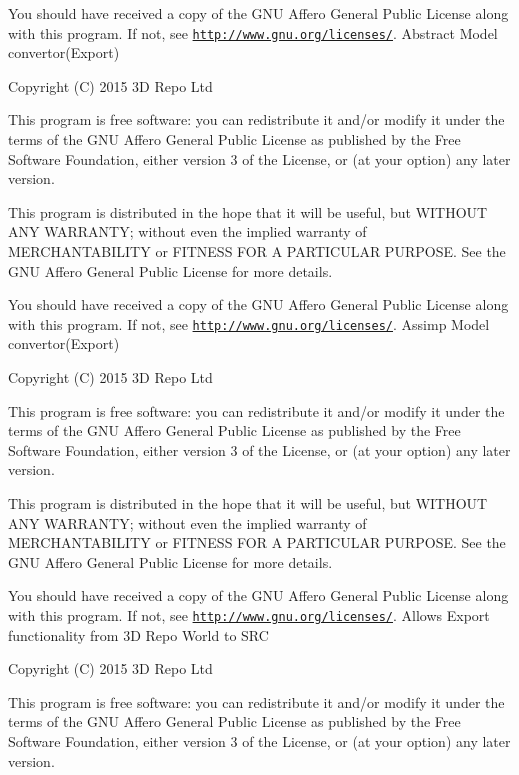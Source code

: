 You should have received a copy of the G\+N\+U Affero General Public License along with this program. If not, see \href{http://www.gnu.org/licenses/}{\tt http\+://www.\+gnu.\+org/licenses/}. Abstract Model convertor(\+Export)

Copyright (C) 2015 3\+D Repo Ltd

This program is free software\+: you can redistribute it and/or modify it under the terms of the G\+N\+U Affero General Public License as published by the Free Software Foundation, either version 3 of the License, or (at your option) any later version.

This program is distributed in the hope that it will be useful, but W\+I\+T\+H\+O\+U\+T A\+N\+Y W\+A\+R\+R\+A\+N\+T\+Y; without even the implied warranty of M\+E\+R\+C\+H\+A\+N\+T\+A\+B\+I\+L\+I\+T\+Y or F\+I\+T\+N\+E\+S\+S F\+O\+R A P\+A\+R\+T\+I\+C\+U\+L\+A\+R P\+U\+R\+P\+O\+S\+E. See the G\+N\+U Affero General Public License for more details.

You should have received a copy of the G\+N\+U Affero General Public License along with this program. If not, see \href{http://www.gnu.org/licenses/}{\tt http\+://www.\+gnu.\+org/licenses/}. Assimp Model convertor(\+Export)

Copyright (C) 2015 3\+D Repo Ltd

This program is free software\+: you can redistribute it and/or modify it under the terms of the G\+N\+U Affero General Public License as published by the Free Software Foundation, either version 3 of the License, or (at your option) any later version.

This program is distributed in the hope that it will be useful, but W\+I\+T\+H\+O\+U\+T A\+N\+Y W\+A\+R\+R\+A\+N\+T\+Y; without even the implied warranty of M\+E\+R\+C\+H\+A\+N\+T\+A\+B\+I\+L\+I\+T\+Y or F\+I\+T\+N\+E\+S\+S F\+O\+R A P\+A\+R\+T\+I\+C\+U\+L\+A\+R P\+U\+R\+P\+O\+S\+E. See the G\+N\+U Affero General Public License for more details.

You should have received a copy of the G\+N\+U Affero General Public License along with this program. If not, see \href{http://www.gnu.org/licenses/}{\tt http\+://www.\+gnu.\+org/licenses/}. Allows Export functionality from 3\+D Repo World to S\+R\+C

Copyright (C) 2015 3\+D Repo Ltd

This program is free software\+: you can redistribute it and/or modify it under the terms of the G\+N\+U Affero General Public License as published by the Free Software Foundation, either version 3 of the License, or (at your option) any later version.

